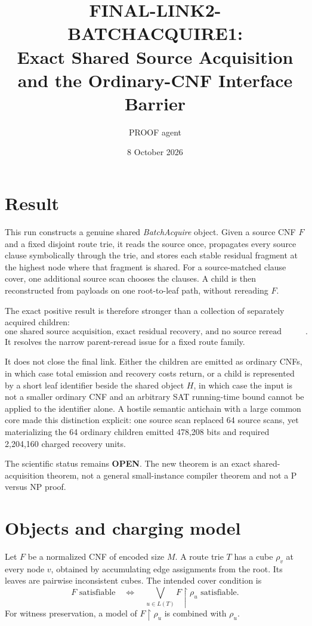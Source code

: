 \documentclass[11pt]{article}
\title{FINAL-LINK2-BATCHACQUIRE1:\\Exact Shared Source Acquisition and the Ordinary-CNF Interface Barrier}
\author{PROOF agent}
\date{8 October 2026}
\newcommand{\res}{\mathbin{\upharpoonright}}
\begin{document}
\maketitle

\section{Result}

This run constructs a genuine shared \emph{BatchAcquire} object.  Given a
source CNF $F$ and a fixed disjoint route trie, it reads the source once,
propagates every source clause symbolically through the trie, and stores each
stable residual fragment at the highest node where that fragment is shared.
For a source-matched clause cover, one additional source scan chooses the
clauses.  A child is then reconstructed from payloads on one root-to-leaf
path, without rereading $F$.

The exact positive result is therefore stronger than a collection of
separately acquired children:
\[
 \boxed{\text{one shared source acquisition, exact residual recovery, and no
 source reread during recovery}.}
\]
It resolves the narrow parent-reread issue for a fixed route family.

It does not close the final link.  Either the children are emitted as
ordinary CNFs, in which case total emission and recovery costs return, or a
child is represented by a short leaf identifier beside the shared object
$H$, in which case the input is not a smaller ordinary CNF and an arbitrary
SAT running-time bound cannot be applied to the identifier alone.  A hostile
semantic antichain with a large common core made this distinction explicit:
one source scan replaced 64 source scans, yet materializing the 64 ordinary
children emitted 478,208 bits and required 2,204,160 charged recovery units.

The scientific status remains \textbf{OPEN}.  The new theorem is an exact
shared-acquisition theorem, not a general small-instance compiler theorem and
not a P versus NP proof.

\section{Objects and charging model}

Let $F$ be a normalized CNF of encoded size $M$.  A route trie $T$ has a cube
$\rho_v$ at every node $v$, obtained by accumulating edge assignments from
the root.  Its leaves are pairwise inconsistent cubes.  The intended cover
condition is
\[
 F\text{ satisfiable}
 \quad\Longleftrightarrow\quad
 \bigvee_{u\in L(T)} F\res\rho_u\text{ satisfiable}.
\]
For witness preservation, a model of $F\res\rho_u$ is combined with $\rho_u$.
\end{document}
